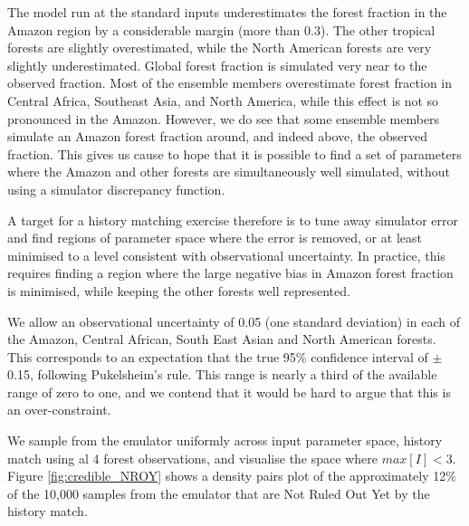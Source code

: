 \documentclass[esd, manuscript]{copernicus}
\begin{document}
The model run at the standard inputs underestimates the forest fraction in the Amazon region by a considerable margin (more than 0.3). The other tropical forests are slightly overestimated, while the North American forests are very slightly underestimated. Global forest fraction is simulated very near to the observed fraction. Most of the ensemble members overestimate forest fraction in Central Africa, Southeast Asia, and North America, while this effect is not so pronounced in the Amazon.  However, we do see that some ensemble members simulate an Amazon forest fraction around, and indeed above, the observed fraction. This gives us cause to hope that it is possible to find a set of parameters where the Amazon and other forests are simultaneously well simulated, without using a simulator discrepancy function. 



A target for a history matching exercise therefore is to tune away simulator error and find regions of parameter space where the error is removed, or at least minimised to a level consistent with observational uncertainty. In practice, this requires finding a region where the large negative bias in Amazon forest fraction is minimised, while keeping the other forests well represented.

We allow an observational uncertainty of 0.05 (one standard deviation) in each of the Amazon, Central African, South East Asian and North American forests. This corresponds to an expectation that the true 95\% confidence interval of $\pm$ 0.15, following Pukelsheim's rule. This range is nearly a third of the available range of zero to one, and we contend that it would be hard to argue that this is an over-constraint.

We sample from the emulator uniformly across input parameter space, history match using al 4 forest observations, and visualise the space where $max[I] < 3$. Figure \ref{fig:credible_NROY} shows a density pairs plot of the approximately 12\% of the 10,000 samples from the emulator that are Not Ruled Out Yet by the history match.
\end{document}
